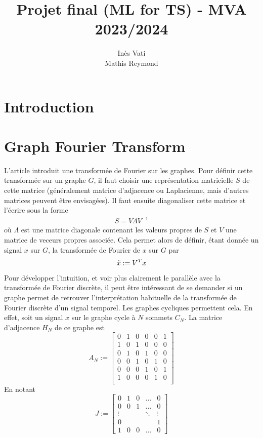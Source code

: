 \documentclass[11pt]{article}
\title{Projet final (ML for TS) - MVA 2023/2024}
\author{
Inès Vati \email{ines.vati@eleves.enpc.fr} \\ %
Mathis Reymond \email{mathis.reymond74@gmail.com} %
}
\begin{document}
\maketitle

\section{Introduction}


\section{Graph Fourier Transform}

L'article introduit une transformée de Fourier sur les graphes. Pour définir cette transformée sur un graphe $G$, il faut choisir une représentation matricielle $S$ de cette matrice (généralement matrice d'adjacence ou Laplacienne, mais d'autres matrices peuvent être envisagées). Il faut ensuite diagonaliser cette matrice et l'écrire sous la forme
\begin{align}
    S = V\Lambda V^{-1}
\end{align}
où $\Lambda$ est une matrice diagonale contenant les valeurs propres de $S$ et $V$ une matrice de veceurs propres associée. Cela permet alors de définir, étant donnée un signal $x$ sur $G$, la transformée de Fourier de $x$ sur $G$ par
\begin{equation}
    \Tilde{x} := V^Tx \label{eq:GFT}
\end{equation}
Pour développer l'intuition, et voir plus clairement le parallèle avec la transformée de Fourier discrète, il peut être intéressant de se demander si un graphe permet de retrouver l'interprétation habituelle de la transformée de Fourier discrète d'un signal temporel. Les graphes cycliques permettent cela. En effet, soit un signal $x$ sur le graphe cycle à $N$ sommets $C_N$. La matrice d'adjacence $H_N$ de ce graphe est 
\[ A_N := 
\begin{bmatrix}
0 & 1 & 0 & 0 & 0 & 1 \\
1 & 0 & 1 & 0 & 0 & 0 \\
0 & 1 & 0 & 1 & 0 & 0 \\
0 & 0 & 1 & 0 & 1 & 0 \\
0 & 0 & 0 & 1 & 0 & 1 \\
1 & 0 & 0 & 0 & 1 & 0 \\
\end{bmatrix}
\]
En notant
\[J :=
\begin{bmatrix}
0 & 1 & 0 & \dots & 0 \\
0 & 0 & 1 & \dots & 0 \\
\vdots  &     &     & \ddots & \vdots  \\
0 & & &        & 1 \\
1 & 0 & 0 & \dots  & 0
\end{bmatrix}
\]
\end{document}
